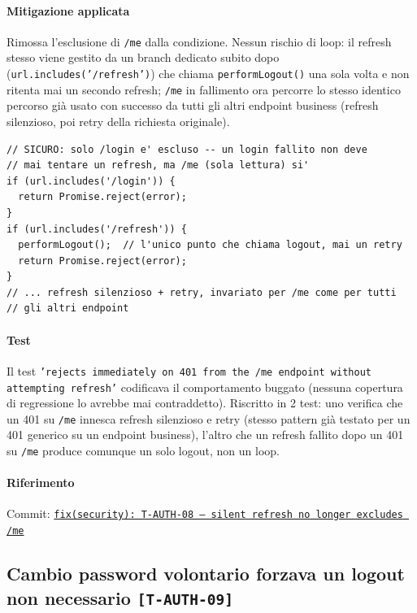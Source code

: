 ﻿\documentclass[a4paper,12pt]{report}
\newcommand{\commitref}[2]{\texttt{\small \href{https://github.com/diegoandruccioli/hotel-pms/commit/#1}{#2}}}
\newcommand{\threat}[1]{\texttt{\small\textcolor{vulnred}{[#1]}}}
\begin{document}
\paragraph{Mitigazione applicata}
Rimossa l'esclusione di \texttt{/me} dalla condizione. Nessun rischio di loop:
il refresh stesso viene gestito da un branch dedicato subito dopo
(\texttt{url.includes('/refresh')}) che chiama \texttt{performLogout()} una
sola volta e non ritenta mai un secondo refresh; \texttt{/me} in fallimento
ora percorre lo stesso identico percorso già usato con successo da tutti gli
altri endpoint business (refresh silenzioso, poi retry della richiesta
originale).

\begin{securebox}[title={Codice Sicuro --- api.ts (fix)}]
\begin{lstlisting}[style=java]
// SICURO: solo /login e' escluso -- un login fallito non deve
// mai tentare un refresh, ma /me (sola lettura) si'
if (url.includes('/login')) {
  return Promise.reject(error);
}
if (url.includes('/refresh')) {
  performLogout();  // l'unico punto che chiama logout, mai un retry
  return Promise.reject(error);
}
// ... refresh silenzioso + retry, invariato per /me come per tutti
// gli altri endpoint
\end{lstlisting}
\end{securebox}

\paragraph{Test}
Il test \texttt{'rejects immediately on 401 from the /me endpoint without
attempting refresh'} codificava il comportamento buggato (nessuna copertura
di regressione lo avrebbe mai contraddetto). Riscritto in 2 test: uno verifica
che un 401 su \texttt{/me} innesca refresh silenzioso e retry (stesso pattern
già testato per un 401 generico su un endpoint business), l'altro che un
refresh fallito dopo un 401 su \texttt{/me} produce comunque un solo logout,
non un loop.

\paragraph{Riferimento} Commit: \commitref{[pending]}{fix(security): T-AUTH-08 --- silent refresh no longer excludes /me}

\subsection{Cambio password volontario forzava un logout non necessario \threat{T-AUTH-09}}
\end{document}
